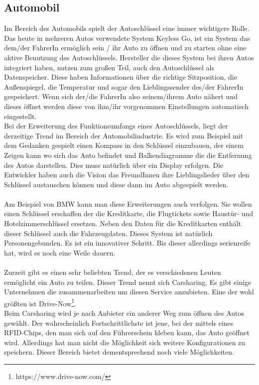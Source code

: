 \subsection{Automobil} 
Im Bereich des Automobils spielt der Autoschlüssel eine immer wichtigere Rolle. Das heute in mehreren Autos verwendete System Keyless Go, ist ein System das dem/der FahrerIn ermöglich sein / ihr Auto zu öffnen und zu starten ohne eine aktive Benutzung des Autoschlüssels. Hersteller die dieses System bei ihren Autos integriert haben, nutzen zum großen Teil, auch den Autoschlüssel als Datenspeicher. Diese haben Informationen über die richtige Sitzposition, die Außenspiegel, die Temperatur und sogar den Lieblingssender des/der FahrerIn gespeichert. Wenn sich der/die FahrerIn also seinem/ihrem Auto nähert und dieses öffnet werden diese von ihm/ihr vorgenommen Einstellungen automatisch eingestellt. 
\\
Bei der Erweiterung des Funktionsumfangs eines Autoschlüssels, liegt der derzeitige Trend im Bereich der Automobilindustrie.
Es wird zum Beispiel mit dem Gedanken gespielt einen Kompass in den Schlüssel einzubauen, der einem Zeigen kann wo sich das Auto befindet und Balkendiagramme die die Entfernung des Autos darstellen. Dies muss natürlich über ein Display erfolgen. 
Die Entwickler haben auch die Vision das FreundInnen ihre Lieblingslieder über den Schlüssel austauschen können und diese dann im Auto abgespielt werden. 
\\\\     
Am Beispiel von BMW kann man diese Erweiterungen auch verfolgen. Sie wollen einen Schlüssel erschaffen der die Kreditkarte, die Flugtickets sowie Haustür- und Hotelzimmerschlüssel ersetzen. 
Neben den Daten für die Kreditkarten enthält dieser Schlüssel auch die Fahrzeugdaten. Dieses System ist natürlich Personengebunden. Es ist ein innovativer Schritt.
Bis dieser allerdings serienreife hat, wird es noch eine Weile dauern. 
\\\\
Zurzeit gibt es einen sehr beliebten Trend, der es verschiedenen Leuten ermöglicht ein Auto zu teilen. Dieser Trend nennt sich Carsharing. Es gibt einige Unternehmen die zusammenarbeiten um diesen Service anzubieten. Eine der wohl größten ist Drive-Now\footnote{https://www.drive-now.com/}. 
\\
Beim Carsharing wird je nach Anbieter ein anderer Weg zum öffnen des Autos gewählt. 
Der wahrscheinlich Fortschrittlichste ist jene, bei der mittels eines RFID-Chips, den man sich auf den Führerschein kleben kann, das Auto geöffnet wird.  
Allerdings hat man nicht die Möglichkeit sich weitere Konfigurationen zu speichern. Dieser Bereich bietet dementsprechend noch viele Möglichkeiten.


